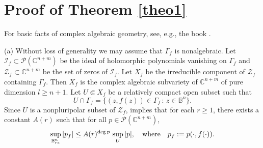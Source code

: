 \documentclass[11pt, oneside]{amsart}
\begin{document}
\section{Proof of Theorem \ref{theo1}}
For basic facts of complex algebraic geometry, see, e.g., the book \cite{M}.

(a) Without loss of generality we may assume that $\Gamma_f$ is 
nonalgebraic. Let $\mathcal I_f\subset\mathcal P(\mathbb C^{n+m})$ be the ideal of holomorphic polynomials vanishing on $\Gamma_f$ and $\mathcal Z_f\subset\mathbb C^{n+m}$ be the set of zeros of $\mathcal I_f$. Let $X_f$ be the irreducible component of $\mathcal Z_f$ containing $\Gamma_f$.
Then $X_f$ is the complex algebraic subvariety of $\mathbb C^{n+m}$ of pure dimension $l\ge n+1$. Let  $U\Subset X_f$ be a relatively compact open subset such that 
\[
U\cap\Gamma_f=\{(z, f(z))\in\Gamma_f\, :\, z\in\mathbb B^n\}.
\]
Since $U$ is a nonpluripolar subset of  $\mathcal Z_f$, \cite[Th.~2.2]{S} implies that for each $r\ge 1$, there exists a constant $A(r)$ such that for all $p\in\mathcal P(\mathbb C^{n+m})$,
\begin{equation}\label{eq2.6}
\sup_{\mathbb B^n_{re}} |p_f|\le A(r)^{{\rm deg}\,p}\,\sup_{U}|p|,\quad {\rm where}\quad  p_f:=p(\cdot,f(\cdot)).
\end{equation}
\end{document}
